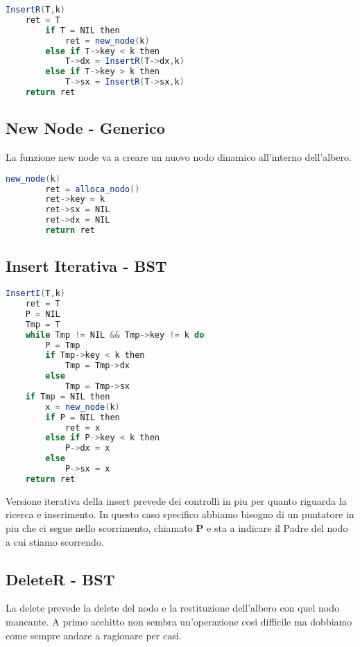 \begin{lstlisting}[language=Java]
	InsertR(T,k)
	ret = T
		if T = NIL then
			ret = new_node(k)
		else if T->key < k then
			T->dx = InsertR(T->dx,k)
		else if T->key > k then
			T->sx = InsertR(T->sx,k)
	return ret
\end{lstlisting}

\subsection{New Node - Generico}
La funzione new node va a creare un nuovo nodo dinamico all'interno dell'albero.

\begin{lstlisting}[language=Java]
	new_node(k)
		ret = alloca_nodo()
		ret->key = k
		ret->sx = NIL
		ret->dx = NIL
		return ret
\end{lstlisting}

\subsection{Insert Iterativa - BST}


\begin{lstlisting}[language=Java]
	InsertI(T,k)
	ret = T
	P = NIL
	Tmp = T
	while Tmp != NIL && Tmp->key != k do
		P = Tmp
		if Tmp->key < k then
			Tmp = Tmp->dx
		else
			Tmp = Tmp->sx
	if Tmp = NIL then
		x = new_node(k)
		if P = NIL then
			ret = x
		else if P->key < k then
			P->dx = x
		else
			P->sx = x
	return ret
\end{lstlisting}

Versione iterativa della insert prevede dei controlli in piu per quanto riguarda la ricerca e inserimento. In questo caso specifico abbiamo bisogno di un puntatore in piu che ci segue nello scorrimento, chiamato \textbf{P} e sta a indicare il Padre del nodo a cui stiamo scorrendo.

\subsection{DeleteR - BST}
La delete prevede la delete del nodo e la restituzione dell'albero con quel nodo mancante. A primo acchitto non sembra un'operazione cosi difficile ma dobbiamo come sempre andare a ragionare per casi.

